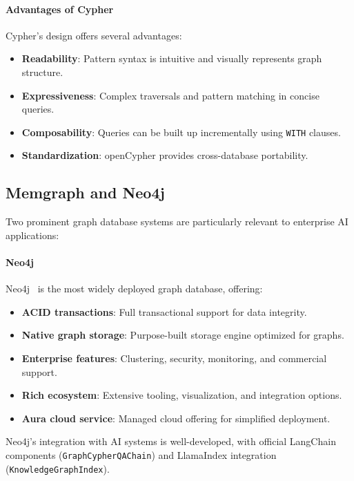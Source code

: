 \documentclass[a4paper,twoside]{sapthesis}
\begin{document}
\paragraph{Advantages of Cypher}

Cypher's design offers several advantages:
\begin{itemize}
    \item \textbf{Readability}: Pattern syntax is intuitive and visually represents graph structure.
    \item \textbf{Expressiveness}: Complex traversals and pattern matching in concise queries.
    \item \textbf{Composability}: Queries can be built up incrementally using \texttt{WITH} clauses.
    \item \textbf{Standardization}: openCypher provides cross-database portability.
\end{itemize}

\subsection{Memgraph and Neo4j}

Two prominent graph database systems are particularly relevant to enterprise AI applications:

\paragraph{Neo4j}

Neo4j~\cite{neo4j2023}
is the most widely deployed graph database, offering:
\begin{itemize}
    \item \textbf{ACID transactions}: Full transactional support for data integrity.
    \item \textbf{Native graph storage}: Purpose-built storage engine optimized for graphs.
    \item \textbf{Enterprise features}: Clustering, security, monitoring, and commercial support.
    \item \textbf{Rich ecosystem}: Extensive tooling, visualization, and integration options.
    \item \textbf{Aura cloud service}: Managed cloud offering for simplified deployment.
\end{itemize}

Neo4j's integration with AI systems is well-developed, with official LangChain components (\texttt{GraphCypherQAChain}) and LlamaIndex integration (\texttt{KnowledgeGraphIndex}).
\end{document}
